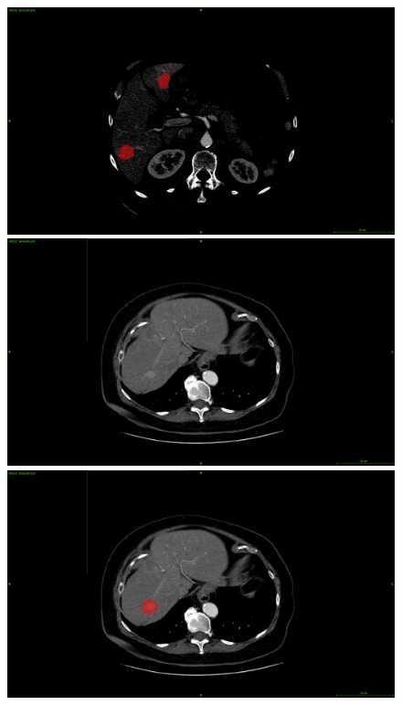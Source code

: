 {\begin{figure}[!ht]
\begin{mdframed}[backgroundcolor=blue!50,linecolor=blue!50]
\begin{minipage}{0.3\linewidth}
		\end{minipage} \hspace{-0.1cm}
		\begin{minipage}{0.3\linewidth}
			\includegraphics[width=\linewidth]{images/MisSegmentations/TCGA-DD-A1ED_slice41_TumorPrediction}
		\end{minipage} \vspace{0.3cm}
		\begin{minipage}{0.45\linewidth}
			\includegraphics[width=\linewidth]{images/MisSegmentations/TCGA-DD-A4NK_slice75_raw}
		\end{minipage} \hspace{-0.1cm}
		\begin{minipage}{0.45\linewidth}
			\includegraphics[width=\linewidth]{images/MisSegmentations/TCGA-DD-A4NK_slice75_TumorPrediction}

\end{minipage}
\end{mdframed}
\end{figure}}
